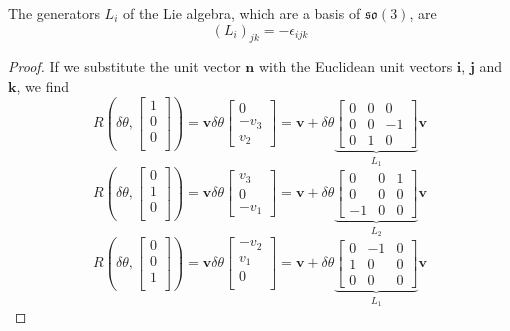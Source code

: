     The generators $L_i$ of the Lie algebra, which are a basis of $\mathfrak{so}(3)$, are
    \begin{equation*}
        {(L_i)}_{jk} = - \epsilon_{ijk}
    \end{equation*}

    \begin{proof}
        If we substitute the unit vector $\mathbf n$ with the Euclidean unit vectors $\mathbf i$, $\mathbf j$ and $\mathbf k$, we find
        \begin{equation*}
            R(\delta \theta, \begin{bmatrix} 1 \\ 0 \\ 0 \\ \end{bmatrix} ) = \mathbf v \delta \theta \begin{bmatrix} 0 \\ -v_3 \\ v_2 \end{bmatrix} = \mathbf v + \delta \theta \underbrace{\begin{bmatrix} 0 & 0 & 0 \\ 0 & 0 & -1 \\ 0 & 1 & 0 \end{bmatrix}}_{L_1} \mathbf v
        \end{equation*}
        \begin{equation*}
            R(\delta \theta, \begin{bmatrix} 0 \\ 1 \\ 0 \\ \end{bmatrix} ) = \mathbf v \delta \theta \begin{bmatrix} v_3 \\ 0 \\ -v_1 \end{bmatrix} = \mathbf v + \delta \theta \underbrace{\begin{bmatrix} 0 & 0 & 1 \\ 0 & 0 & 0 \\ -1 & 0 & 0 \end{bmatrix}}_{L_2} \mathbf v
        \end{equation*}
        \begin{equation*}
            R(\delta \theta, \begin{bmatrix} 0 \\ 0 \\ 1 \\ \end{bmatrix} ) = \mathbf v \delta \theta \begin{bmatrix} -v_2 \\ v_1 \\ 0 \\ \end{bmatrix} = \mathbf v + \delta \theta \underbrace{\begin{bmatrix} 0 & -1 & 0 \\ 1 & 0 & 0 \\ 0 & 0 & 0 \end{bmatrix}}_{L_1} \mathbf v
        \end{equation*}
    \end{proof}

